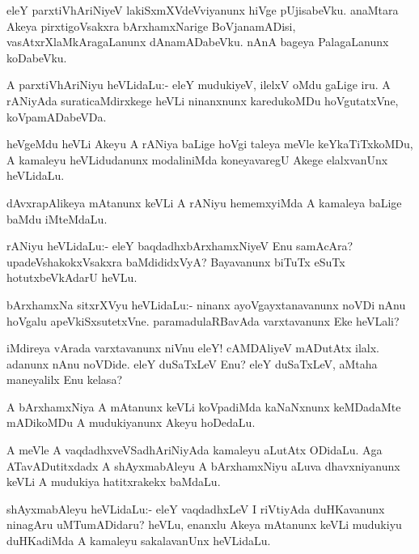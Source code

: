 \begin{mng}
eleY parxtiVhAriNiyeV lakiSxmXVdeVviyanunx hiVge pUjisabeVku. anaMtara Akeya pirxtigoVsakxra bArxhamxNarige BoVjanamADisi, vasAtxrXlaMkAragaLanunx dAnamADabeVku. nAnA bageya PalagaLanunx koDabeVku.
\end{mng}

\begin{mng}
A parxtiVhAriNiyu heVLidaLu:- eleY mudukiyeV, ilelxV oMdu gaLige iru. A rANiyAda suraticaMdirxkege heVLi ninanxnunx karedukoMDu hoVgutatxVne, koVpamADabeVDa.
\end{mng}

\begin{mng}
heVgeMdu heVLi Akeyu A rANiya baLige hoVgi taleya meVle keYkaTiTxkoMDu, A kamaleyu heVLidudanunx modaliniMda koneyavaregU Akege elalxvanUnx heVLidaLu.
\end{mng}

\begin{mng}
dAvxrapAlikeya mAtanunx keVLi A rANiyu hememxyiMda A kamaleya baLige baMdu iMteMdaLu.
\end{mng}

\begin{mng}
rANiyu heVLidaLu:- eleY baqdadhxbArxhamxNiyeV Enu samAcAra? upadeVshakokxVsakxra baMdididxVyA? Bayavanunx biTuTx eSuTx hotutxbeVkAdarU heVLu.
\end{mng}

\begin{mng}
bArxhamxNa sitxrXVyu heVLidaLu:- ninanx ayoVgayxtanavanunx noVDi nAnu hoVgalu apeVkiSxsutetxVne. paramadulaRBavAda varxtavanunx Eke heVLali?
\end{mng}

\begin{mng}
iMdireya vArada varxtavanunx niVnu eleY! cAMDAliyeV mADutAtx ilalx. adanunx nAnu noVDide. eleY duSaTxLeV Enu? eleY duSaTxLeV, aMtaha maneyalilx Enu kelasa?
\end{mng}

\begin{mng}
A bArxhamxNiya A mAtanunx keVLi koVpadiMda kaNaNxnunx keMDadaMte mADikoMDu A mudukiyanunx Akeyu hoDedaLu.
\end{mng}

\begin{mng}
A meVle A vaqdadhxveVSadhAriNiyAda kamaleyu aLutAtx ODidaLu. Aga ATavADutitxdadx A shAyxmabAleyu A bArxhamxNiyu aLuva dhavxniyanunx keVLi A mudukiya hatitxrakekx baMdaLu.
\end{mng}

\begin{mng}
shAyxmabAleyu heVLidaLu:- eleY vaqdadhxLeV I riVtiyAda duHKavanunx ninagAru uMTumADidaru? heVLu, enanxlu Akeya mAtanunx keVLi mudukiyu duHKadiMda A kamaleyu sakalavanUnx heVLidaLu.
\end{mng}

